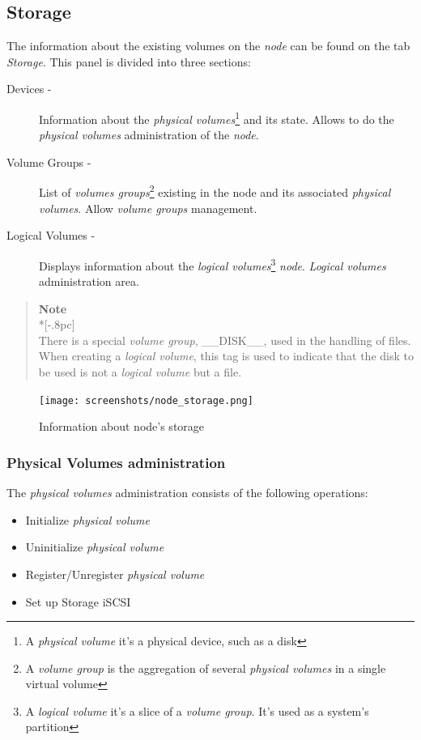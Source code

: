 \subsection{Storage}
\label{sec:storage}

The information about the existing volumes on the \emph{node} can be found on the tab \emph{Storage}.
This panel is divided into three sections:

\begin{description}
	\item[Devices -] Information about the \emph{physical volumes}\footnote{A \emph{physical volume} it's a physical device, such as a disk} and its state. Allows to do the \emph{physical volumes} administration of the \emph{node}.
	\item[Volume Groups -] List of \emph{volumes groups}\footnote{A \emph{volume group} is the aggregation of several \emph{physical volumes} in a single virtual volume} existing in the node and its associated \emph{physical volumes}. Allow \emph{volume groups} management.
	\item[Logical Volumes -] Displays information about the \emph{logical volumes}\footnote{A \emph{logical volume} it's a slice of a \emph{volume group}. It's used as a system's partition} \emph{node}. \emph{Logical volumes} administration area.
\end{description}


\begin{quote}
	{\large \bf Note} \\*[-.8pc]
	\underline{\hspace{6in}} \\
There is a special \emph{volume group}, \_\_DISK\_\_, used in the handling of files. When creating a \emph{logical volume}, this tag is used to indicate that the disk to be used is not a \emph{logical volume} but a file.
\end{quote}


\begin{figure}[H]
	\begin{center}
	\texttt{[image: screenshots/node\_storage.png]}
	\caption{Information about node's storage}
	\label{fig:inicial}
	\end{center}
\end{figure}


\subsubsection{Physical Volumes administration}
The \emph{physical volumes} administration consists of the following operations:
\begin{itemize}
	\item Initialize \emph{physical volume}
    \item Uninitialize \emph{physical volume}
    \item Register/Unregister \emph{physical volume}
    \item Set up Storage iSCSI
\end{itemize}


